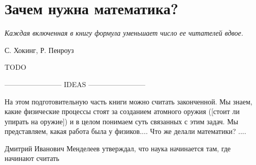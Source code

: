 \chapter{Зачем нужна математика?}

\epigraph{\emph{Каждая включенная в книгу формула \break уменьшает число ее читателей вдвое.}}{С. Хокинг, Р. Пенроуз}

TODO

------------------------ IDEAS ------------------------ 

На этом подготовительную часть книги можно считать законченной.
Мы знаем, какие физические процессы стоят за созданием атомного оружия ([стоит ли упирать на оружие]) и в целом понимаем суть связанных с этим задач.
Мы представляем, какая работа была у физиков....
Что же делали математики? ....


Дмитрий Иванович Менделеев утверждал, что наука начинается там, где начинают считать
